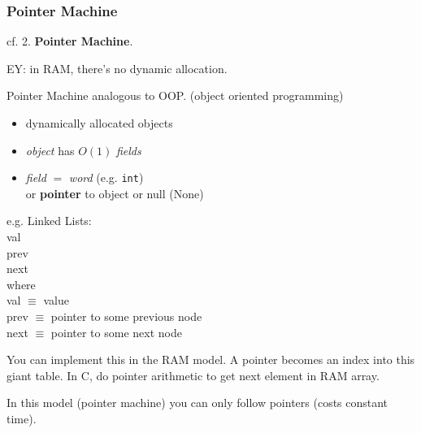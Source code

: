 \documentclass[10pt]{amsart}
\begin{document}
\begin{multicols*}{2}
\subsubsection{Pointer Machine}

cf. 2. \textbf{Pointer Machine}.

EY: in RAM, there's no dynamic allocation.

Pointer Machine analogous to OOP. (object oriented programming)

\begin{itemize}
	\item dynamically allocated objects 
	\item \emph{object} has $O(1)$ \emph{fields}
	\item \emph{field} $=$ \emph{word} (e.g. \texttt{int}) \\
	or \textbf{pointer} to object or null (None)
\end{itemize}

e.g. Linked Lists: \\

val \\
prev \\
next \\

where \\
val $\equiv $ value \\
prev $\equiv $ pointer to some previous node \\
next $\equiv $ pointer to some next node \\




You can implement this in the RAM model. A pointer becomes an index into this giant table. In C, do pointer arithmetic to get next element in RAM array.

In this model (pointer machine) you can only follow pointers (costs constant time).


\end{multicols*}
\end{document}
